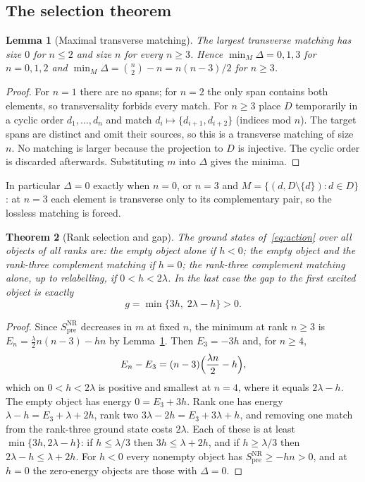 \documentclass[11pt]{article}
\newtheorem{theorem}{Theorem}[section]
\newtheorem{lemma}[theorem]{Lemma}
\theoremstyle{definition}
\theoremstyle{remark}
\newcommand{\Spre}{S^{\mathrm{NR}}_{\mathrm{pre}}}
\begin{document}
\subsection{The selection theorem}
\label{sec:selection}

\begin{lemma}[Maximal transverse matching]
\label{lem:maxmatch}
The largest transverse matching has size $0$ for $n\le2$ and size $n$ for every $n\ge3$.
Hence $\min_M\Delta=0,1,3$ for $n=0,1,2$ and $\min_M\Delta=\binom n2-n=n(n-3)/2$ for
$n\ge3$.
\end{lemma}

\begin{proof}
For $n=1$ there are no spans; for $n=2$ the only span contains both elements, so
transversality forbids every match. For $n\ge3$ place $D$ temporarily in a cyclic order
$d_1,\dots,d_n$ and match $d_i\mapsto\{d_{i+1},d_{i+2}\}$ (indices mod $n$). The target
spans are distinct and omit their sources, so this is a transverse matching of size $n$.
No matching is larger because the projection to $D$ is injective. The cyclic order is
discarded afterwards. Substituting $m$ into $\Delta$ gives the minima.
\end{proof}

In particular $\Delta=0$ exactly when $n=0$, or $n=3$ and $M=\{(d,D\setminus\{d\}):d\in D\}$:
at $n=3$ each element is transverse only to its complementary pair, so the lossless
matching is forced.

\begin{theorem}[Rank selection and gap]
\label{thm:selection}
The ground states of~\eqref{eq:action} over all objects of all ranks are: the empty
object alone if $h<0$; the empty object and the rank-three complement matching if $h=0$;
the rank-three complement matching alone, up to relabelling, if $0<h<2\lambda$. In the
last case the gap to the first excited object is exactly
\begin{equation}
g=\min\{3h,\;2\lambda-h\}>0 .
\label{eq:gap}
\end{equation}
\end{theorem}

\begin{proof}
Since $\Spre$ decreases in $m$ at fixed $n$, the minimum at rank $n\ge3$ is
$E_n=\frac{\lambda}{2}n(n-3)-hn$ by Lemma~\ref{lem:maxmatch}. Then $E_3=-3h$ and, for
$n\ge4$,
\begin{equation}
E_n-E_3=(n-3)\Bigl(\frac{\lambda n}{2}-h\Bigr),
\label{eq:diff}
\end{equation}
which on $0<h<2\lambda$ is positive and smallest at $n=4$, where it equals $2\lambda-h$.
The empty object has energy $0=E_3+3h$. Rank one has energy $\lambda-h=E_3+\lambda+2h$,
rank two $3\lambda-2h=E_3+3\lambda+h$, and removing one match from the rank-three ground
state costs $2\lambda$. Each of these is at least $\min\{3h,2\lambda-h\}$: if
$h\le\lambda/3$ then $3h\le\lambda+2h$, and if $h\ge\lambda/3$ then
$2\lambda-h\le\lambda+2h$. For $h<0$ every nonempty object has $\Spre\ge-hn>0$, and at
$h=0$ the zero-energy objects are those with $\Delta=0$.
\end{proof}
\end{document}
